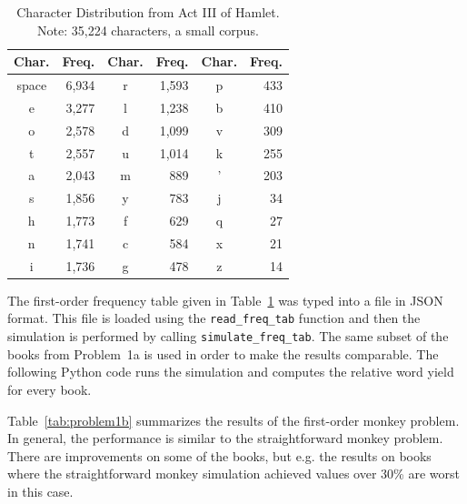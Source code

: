 \documentclass[conference]{IEEEtran}
\newcommand{\codeinline}[1]{{\fontsize{8}{0}\selectfont\texttt{#1}}}
\newcommand{\codefile}[1]{
  \begin{framed}
  \fontsize{5.65}{6.78}\selectfont
  
  \end{framed}
}
\begin{document}
\begin{table}[htb]
\caption{\hspace{2em}Character Distribution from Act III of Hamlet. \newline
Note: 35,224 characters, a small corpus.\label{tab:hamlet}}
\vspace{-10pt}
\begin{center}
\begin{tabular}{crcrcr}
\hline
Char. & Freq. & Char. & Freq. & Char. & Freq. \\
\hline
space & 6,934  & r     & 1,593  & p     & 433   \\
e     & 3,277  & l     & 1,238  & b     & 410   \\
o     & 2,578  & d     & 1,099  & v     & 309   \\
t     & 2,557  & u     & 1,014  & k     & 255   \\
a     & 2,043  & m     & 889   & '     & 203   \\
s     & 1,856  & y     & 783   & j     & 34    \\
h     & 1,773  & f     & 629   & q     & 27    \\
n     & 1,741  & c     & 584   & x     & 21    \\
i     & 1,736  & g     & 478   & z     & 14    \\
\hline
\end{tabular}
\end{center}
\end{table}

The first-order frequency table given in Table~\ref{tab:hamlet} was typed into a file in JSON format.
This file is loaded using the \codeinline{read\_freq\_tab} function and then the simulation is performed by calling \codeinline{simulate\_freq\_tab}.
The same subset of the books from Problem~1a is used in order to make the results comparable.
The following Python code runs the simulation and computes the relative word yield for every book.

\codefile{problem1b.py}

Table~\ref{tab:problem1b} summarizes the results of the first-order monkey problem.
In general, the performance is similar to the straightforward monkey problem.
There are improvements on some of the books, but e.g. the results on books where the straightforward monkey simulation achieved values over 30\% are worst in this case.
\end{document}
